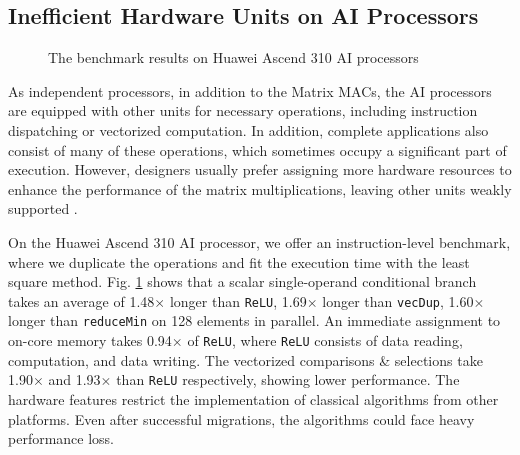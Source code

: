 \documentclass[12pt]{extbook}
\begin{document}
\subsection{Inefficient Hardware Units on AI Processors}

\begin{figure}[tbp]
    \caption{The benchmark results on Huawei Ascend 310 AI processors}
    \label{fig:benchmark}
    \end{figure}

As independent processors, in addition to the Matrix MACs, the AI processors are equipped with other units for necessary operations, including instruction dispatching or vectorized computation. In addition, complete applications also consist of many of these operations, which sometimes occupy a significant part of execution. However, designers usually prefer assigning more hardware resources to enhance the performance of the matrix multiplications, leaving other units weakly supported \cite{DBLP:conf/icpp/JiW21, DBLP:conf/hotchips/LiaoTXZ19, DBLP:conf/isca/LiuDTHLXCC16, DBLP:conf/isca/JouppiYPPABBBBB17, cambricon, CANN, jax}. 

On the Huawei Ascend 310 AI processor, we offer an instruction-level benchmark, where we duplicate the operations and fit the execution time with the least square method. Fig. \ref{fig:benchmark} shows that a scalar single-operand conditional branch takes an average of 1.48$\times$ longer than \verb|ReLU|, 1.69$\times$ longer than \verb|vecDup|, 1.60$\times$ longer than \verb|reduceMin| on 128 elements in parallel. An immediate assignment to on-core memory takes 0.94$\times$ of \verb|ReLU|, where \verb|ReLU| consists of data reading, computation, and data writing. The vectorized comparisons \& selections take 1.90$\times$ and 1.93$\times$ than \verb|ReLU| respectively, showing lower performance. The hardware features restrict the implementation of classical algorithms from other platforms. Even after successful migrations, the algorithms could face heavy performance loss.
\end{document}
